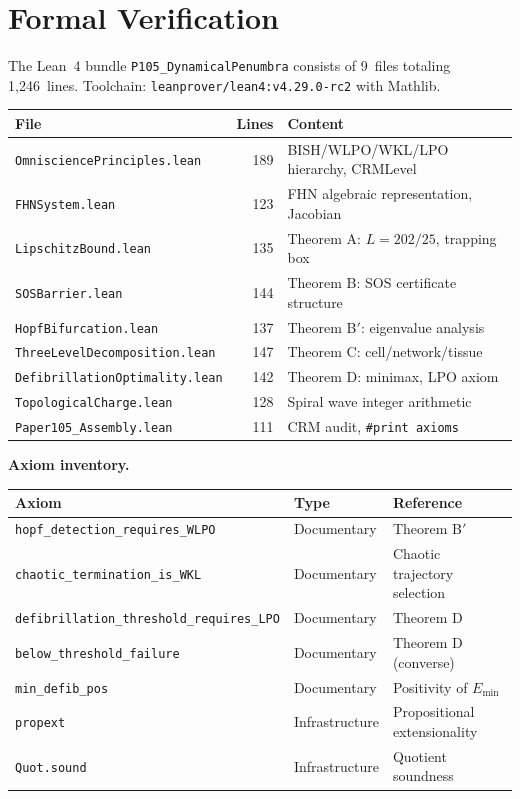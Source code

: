 \documentclass[11pt,a4paper]{article}
\theoremstyle{plain}
\theoremstyle{definition}
\begin{document}
\section{Formal Verification}\label{sec:lean}

The Lean~4 bundle \texttt{P105\_DynamicalPenumbra} consists of 9~files totaling 1,246~lines.  Toolchain: \texttt{leanprover/lean4:v4.29.0-rc2} with Mathlib.

\begin{center}
\begin{tabular}{lrl}
\toprule
\textbf{File} & \textbf{Lines} & \textbf{Content} \\
\midrule
\texttt{OmnisciencePrinciples.lean} & 189 & BISH/WLPO/WKL/LPO hierarchy, CRMLevel \\
\texttt{FHNSystem.lean} & 123 & FHN algebraic representation, Jacobian \\
\texttt{LipschitzBound.lean} & 135 & Theorem A: $L = 202/25$, trapping box \\
\texttt{SOSBarrier.lean} & 144 & Theorem B: SOS certificate structure \\
\texttt{HopfBifurcation.lean} & 137 & Theorem B$'$: eigenvalue analysis \\
\texttt{ThreeLevelDecomposition.lean} & 147 & Theorem C: cell/network/tissue \\
\texttt{DefibrillationOptimality.lean} & 142 & Theorem D: minimax, LPO axiom \\
\texttt{TopologicalCharge.lean} & 128 & Spiral wave integer arithmetic \\
\texttt{Paper105\_Assembly.lean} & 111 & CRM audit, \texttt{\#print axioms} \\
\bottomrule
\end{tabular}
\end{center}

\textbf{Axiom inventory.}

\begin{center}
\begin{tabular}{lll}
\toprule
\textbf{Axiom} & \textbf{Type} & \textbf{Reference} \\
\midrule
\texttt{hopf\_detection\_requires\_WLPO} & Documentary & Theorem B$'$ \\
\texttt{chaotic\_termination\_is\_WKL} & Documentary & Chaotic trajectory selection \\
\texttt{defibrillation\_threshold\_requires\_LPO} & Documentary & Theorem D \\
\texttt{below\_threshold\_failure} & Documentary & Theorem D (converse) \\
\texttt{min\_defib\_pos} & Documentary & Positivity of $E_{\min}$ \\
\texttt{propext} & Infrastructure & Propositional extensionality \\
\texttt{Quot.sound} & Infrastructure & Quotient soundness \\
\bottomrule
\end{tabular}
\end{center}
\end{document}
